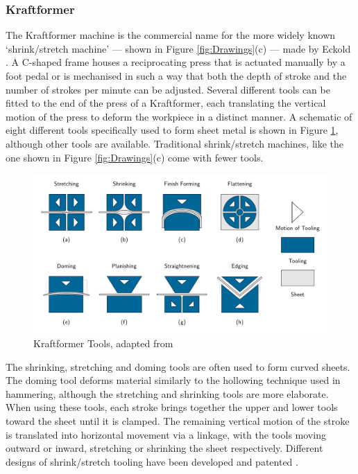 \subsubsection{Kraftformer} \label{sec:ManualKraftformer}

The Kraftformer machine is the commercial name for the more widely known `shrink/stretch machine' --- shown in Figure \ref{fig:Drawings}(c) --- made by Eckold \citep[see][]{EckoldCompany2020CompanyBrochure}. A C-shaped frame houses a reciprocating press that is actuated manually by a foot pedal or is mechanised in such a way that both the depth of stroke and the number of strokes per minute can be adjusted. Several different tools can be fitted to the end of the press of a Kraftformer, each translating the vertical motion of the press to deform the workpiece in a distinct manner. A schematic of eight different tools specifically used to form sheet metal is shown in Figure \ref{fig:Kraftformer}, although other tools are available. Traditional shrink/stretch machines, like the one shown in Figure \ref{fig:Drawings}(c) come with fewer tools.

\begin{figure}[h]
    \centering
    \includegraphics[width=0.7\linewidth]{Images/KraftformingTools4x2S.pdf}
    \caption{Kraftformer Tools, adapted from \citep{EckoldCompany2020CompanyBrochure}}
    \label{fig:Kraftformer}
\end{figure}

The shrinking, stretching and doming tools are often used to form curved sheets. The doming tool deforms material similarly to the hollowing technique used in hammering, although the stretching and shrinking tools are more elaborate. When using these tools, each stroke brings together the upper and lower tools toward the sheet until it is clamped. The remaining vertical motion of the stroke is translated into horizontal movement via a linkage, with the tools moving outward or inward, stretching or shrinking the sheet respectively. Different designs of shrink/stretch tooling have been developed and patented \citep{Joyner1943SheetMachine,Rusch2011ShrinkerMachine,Eckold1950ToolElements,EckoldWalter1954ApparatusProfiles}.

